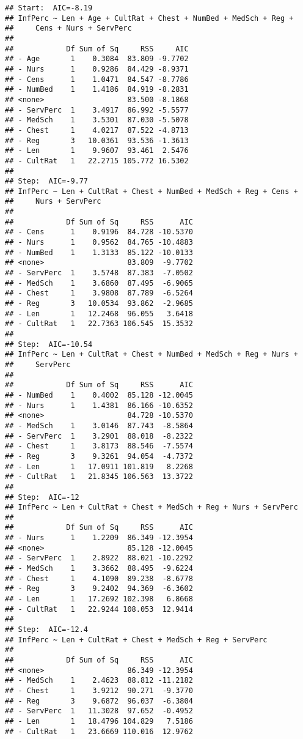 \documentclass[]{article}
\begin{document}
\begin{verbatim}
## Start:  AIC=-8.19
## InfPerc ~ Len + Age + CultRat + Chest + NumBed + MedSch + Reg + 
##     Cens + Nurs + ServPerc
## 
##            Df Sum of Sq     RSS     AIC
## - Age       1    0.3084  83.809 -9.7702
## - Nurs      1    0.9286  84.429 -8.9371
## - Cens      1    1.0471  84.547 -8.7786
## - NumBed    1    1.4186  84.919 -8.2831
## <none>                   83.500 -8.1868
## - ServPerc  1    3.4917  86.992 -5.5577
## - MedSch    1    3.5301  87.030 -5.5078
## - Chest     1    4.0217  87.522 -4.8713
## - Reg       3   10.0361  93.536 -1.3613
## - Len       1    9.9607  93.461  2.5476
## - CultRat   1   22.2715 105.772 16.5302
## 
## Step:  AIC=-9.77
## InfPerc ~ Len + CultRat + Chest + NumBed + MedSch + Reg + Cens + 
##     Nurs + ServPerc
## 
##            Df Sum of Sq     RSS      AIC
## - Cens      1    0.9196  84.728 -10.5370
## - Nurs      1    0.9562  84.765 -10.4883
## - NumBed    1    1.3133  85.122 -10.0133
## <none>                   83.809  -9.7702
## - ServPerc  1    3.5748  87.383  -7.0502
## - MedSch    1    3.6860  87.495  -6.9065
## - Chest     1    3.9808  87.789  -6.5264
## - Reg       3   10.0534  93.862  -2.9685
## - Len       1   12.2468  96.055   3.6418
## - CultRat   1   22.7363 106.545  15.3532
## 
## Step:  AIC=-10.54
## InfPerc ~ Len + CultRat + Chest + NumBed + MedSch + Reg + Nurs + 
##     ServPerc
## 
##            Df Sum of Sq     RSS      AIC
## - NumBed    1    0.4002  85.128 -12.0045
## - Nurs      1    1.4381  86.166 -10.6352
## <none>                   84.728 -10.5370
## - MedSch    1    3.0146  87.743  -8.5864
## - ServPerc  1    3.2901  88.018  -8.2322
## - Chest     1    3.8173  88.546  -7.5574
## - Reg       3    9.3261  94.054  -4.7372
## - Len       1   17.0911 101.819   8.2268
## - CultRat   1   21.8345 106.563  13.3722
## 
## Step:  AIC=-12
## InfPerc ~ Len + CultRat + Chest + MedSch + Reg + Nurs + ServPerc
## 
##            Df Sum of Sq     RSS      AIC
## - Nurs      1    1.2209  86.349 -12.3954
## <none>                   85.128 -12.0045
## - ServPerc  1    2.8922  88.021 -10.2292
## - MedSch    1    3.3662  88.495  -9.6224
## - Chest     1    4.1090  89.238  -8.6778
## - Reg       3    9.2402  94.369  -6.3602
## - Len       1   17.2692 102.398   6.8668
## - CultRat   1   22.9244 108.053  12.9414
## 
## Step:  AIC=-12.4
## InfPerc ~ Len + CultRat + Chest + MedSch + Reg + ServPerc
## 
##            Df Sum of Sq     RSS      AIC
## <none>                   86.349 -12.3954
## - MedSch    1    2.4623  88.812 -11.2182
## - Chest     1    3.9212  90.271  -9.3770
## - Reg       3    9.6872  96.037  -6.3804
## - ServPerc  1   11.3028  97.652  -0.4952
## - Len       1   18.4796 104.829   7.5186
## - CultRat   1   23.6669 110.016  12.9762
\end{verbatim}
\end{document}
